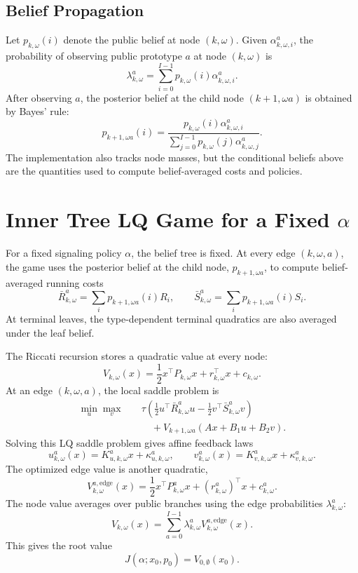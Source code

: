 \documentclass[11pt]{article}
\begin{document}
\subsection{Belief Propagation}

Let $p_{k,\omega}(i)$ denote the public belief at node $(k,\omega)$.  Given
$\alpha_{k,\omega,i}^{a}$, the probability of observing public prototype $a$
at node $(k,\omega)$ is
\[
    \lambda_{k,\omega}^{a}
    =
    \sum_{i=0}^{I-1}
    p_{k,\omega}(i)\alpha_{k,\omega,i}^{a}.
\]
After observing $a$, the posterior belief at the child node $(k+1,\omega a)$
is obtained by Bayes' rule:
\[
    p_{k+1,\omega a}(i)
    =
    \frac{
        p_{k,\omega}(i)\alpha_{k,\omega,i}^{a}
    }{
        \sum_{j=0}^{I-1}p_{k,\omega}(j)\alpha_{k,\omega,j}^{a}
    }.
\]
The implementation also tracks node masses, but the conditional beliefs above
are the quantities used to compute belief-averaged costs and policies.

\section{Inner Tree LQ Game for a Fixed \texorpdfstring{$\alpha$}{alpha}}

For a fixed signaling policy $\alpha$, the belief tree is fixed.  At every
edge $(k,\omega,a)$, the game uses the posterior belief at the child node,
$p_{k+1,\omega a}$, to compute belief-averaged running costs
\[
    \bar R_{k,\omega}^{a}
    =
    \sum_i p_{k+1,\omega a}(i) R_i,
    \qquad
    \bar S_{k,\omega}^{a}
    =
    \sum_i p_{k+1,\omega a}(i) S_i.
\]
At terminal leaves, the type-dependent terminal quadratics are also averaged
under the leaf belief.

The Riccati recursion stores a quadratic value at every node:
\[
    V_{k,\omega}(x)
    =
    \frac{1}{2}x^\top P_{k,\omega}x
    +r_{k,\omega}^\top x
    +c_{k,\omega}.
\]
At an edge $(k,\omega,a)$, the local saddle problem is
\[
\begin{aligned}
    \min_u \max_v\quad
    &\tau\left(
        \frac{1}{2}u^\top \bar R_{k,\omega}^{a} u
        -
        \frac{1}{2}v^\top \bar S_{k,\omega}^{a} v
    \right) \\
    &\quad
    + V_{k+1,\omega a}
    \left(Ax+B_1u+B_2v\right).
\end{aligned}
\]
Solving this LQ saddle problem gives affine feedback laws
\[
    u_{k,\omega}^{a}(x)
    =
    K_{u,k,\omega}^{a}x+\kappa_{u,k,\omega}^{a},
    \qquad
    v_{k,\omega}^{a}(x)
    =
    K_{v,k,\omega}^{a}x+\kappa_{v,k,\omega}^{a}.
\]
The optimized edge value is another quadratic,
\[
    V_{k,\omega}^{a,\mathrm{edge}}(x)
    =
    \frac{1}{2}x^\top P_{k,\omega}^{a}x
    +(r_{k,\omega}^{a})^\top x
    +c_{k,\omega}^{a}.
\]
The node value averages over public branches using the edge probabilities
$\lambda_{k,\omega}^{a}$:
\[
    V_{k,\omega}(x)
    =
    \sum_{a=0}^{I-1}
    \lambda_{k,\omega}^{a}
    V_{k,\omega}^{a,\mathrm{edge}}(x).
\]
This gives the root value
\[
    J(\alpha;x_0,p_0)=V_{0,\emptyset}(x_0).
\]
\end{document}
